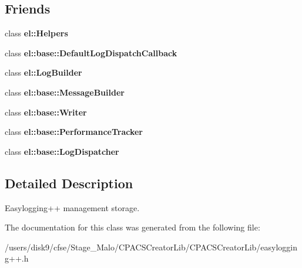 \subsection*{Friends}
\begin{DoxyCompactItemize}
\item 
\hypertarget{classel_1_1base_1_1Storage_a2fb8a2c02cbf86247f093c118bed877a}{class {\bfseries el\-::\-Helpers}}\label{classel_1_1base_1_1Storage_a2fb8a2c02cbf86247f093c118bed877a}

\item 
\hypertarget{classel_1_1base_1_1Storage_a42b1de96d584ae4fecbfc2b9aff95052}{class {\bfseries el\-::base\-::\-Default\-Log\-Dispatch\-Callback}}\label{classel_1_1base_1_1Storage_a42b1de96d584ae4fecbfc2b9aff95052}

\item 
\hypertarget{classel_1_1base_1_1Storage_a8c584bcf767a4d007311a7408b22ad62}{class {\bfseries el\-::\-Log\-Builder}}\label{classel_1_1base_1_1Storage_a8c584bcf767a4d007311a7408b22ad62}

\item 
\hypertarget{classel_1_1base_1_1Storage_a81bbf6fe31fab133d182efa8367304f1}{class {\bfseries el\-::base\-::\-Message\-Builder}}\label{classel_1_1base_1_1Storage_a81bbf6fe31fab133d182efa8367304f1}

\item 
\hypertarget{classel_1_1base_1_1Storage_a7a728edbb2761d151832daa74d5b2736}{class {\bfseries el\-::base\-::\-Writer}}\label{classel_1_1base_1_1Storage_a7a728edbb2761d151832daa74d5b2736}

\item 
\hypertarget{classel_1_1base_1_1Storage_a6a4d7851e1984800be3c230f06a79528}{class {\bfseries el\-::base\-::\-Performance\-Tracker}}\label{classel_1_1base_1_1Storage_a6a4d7851e1984800be3c230f06a79528}

\item 
\hypertarget{classel_1_1base_1_1Storage_a9b37b28ea1c5f8f862cc89f135711d92}{class {\bfseries el\-::base\-::\-Log\-Dispatcher}}\label{classel_1_1base_1_1Storage_a9b37b28ea1c5f8f862cc89f135711d92}

\end{DoxyCompactItemize}


\subsection{Detailed Description}
Easylogging++ management storage. 

The documentation for this class was generated from the following file\-:\begin{DoxyCompactItemize}
\item 
/users/disk9/cfse/\-Stage\-\_\-\-Malo/\-C\-P\-A\-C\-S\-Creator\-Lib/\-C\-P\-A\-C\-S\-Creator\-Lib/easylogging++.\-h\end{DoxyCompactItemize}
